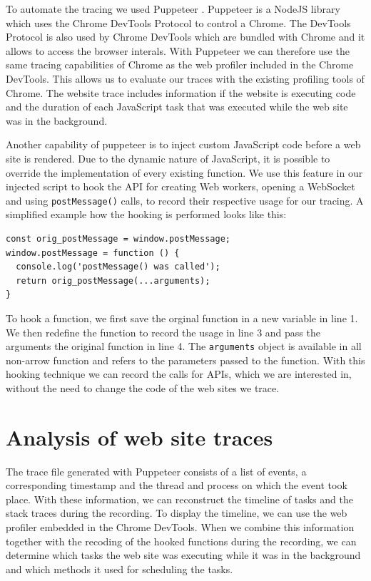 \documentclass[
	ruledheaders=section,%
	class=report,%
	thesis={type=bachelor},%
	accentcolor=9c,%
	custommargins=true,%
	marginpar=false,%
	parskip=half-,%
	fontsize=11pt,%
]{tudapub}
\begin{document}
  To automate the tracing we used Puppeteer \cite{pptr}. Puppeteer is a NodeJS library which uses the Chrome DevTools Protocol \cite{chrome-devtools-protocol} to control a Chrome. The DevTools Protocol is also used by Chrome DevTools which are bundled with Chrome and it allows to access the browser interals. With Puppeteer we can therefore use the same tracing capabilities of Chrome as the web profiler included in the Chrome DevTools. This allows us to evaluate our traces with the existing profiling tools of Chrome. The website trace includes information if the website is executing code and the duration of each JavaScript task that was executed while the web site was in the background.

  Another capability of puppeteer is to inject custom JavaScript code before a web site is rendered. Due to the dynamic nature of JavaScript, it is possible to override the implementation of every existing function. We use this feature in our injected script to hook the API for creating Web workers, opening a WebSocket and using \texttt{postMessage()} calls, to record their respective usage for our tracing. A simplified example how the hooking is performed looks like this:

\begin{lstlisting}
const orig_postMessage = window.postMessage;
window.postMessage = function () {
  console.log('postMessage() was called');
  return orig_postMessage(...arguments);
}
\end{lstlisting}

  To hook a function, we first save the orginal function in a new variable in line 1. We then redefine the function to record the usage in line 3 and pass the arguments the original function in line 4. The \texttt{arguments} object is available in all non-arrow function and refers to the parameters passed to the function. With this hooking technique we can record the calls for APIs, which we are interested in, without the need to change the code of the web sites we trace.

  \section{Analysis of web site traces}
  \label{sec:trace-analysis}

  The trace file generated with Puppeteer consists of a list of events, a corresponding timestamp and the thread and process on which the event took place. With these information, we can reconstruct the timeline of tasks and the stack traces during the recording. To display the timeline, we can use the web profiler embedded in the Chrome DevTools. When we combine this information together with the recoding of the hooked functions during the recording, we can determine which tasks the web site was executing while it was in the background and which methods it used for scheduling the tasks.
\end{document}
